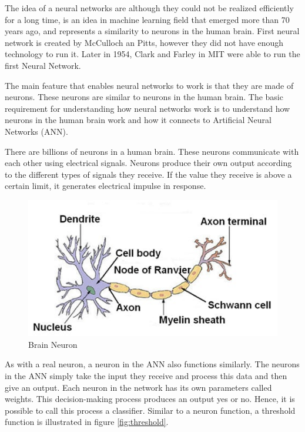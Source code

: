 The idea of a neural networks are although they could not be realized efficiently for a long time, is an idea in machine learning field that emerged more than 70 years ago, and represents a similarity to neurons in the human brain. First neural network is created by McCulloch an Pitts, however they did not have enough technology to run it. Later in 1954, Clark and Farley in MIT were able to run the first Neural Network.

The main feature that enables neural networks to work is that they are made of neurons. These neurons are similar to neurons in the human brain. The basic requirement for understanding how neural networks work is to understand how neurons in the human brain work and how it connects to Artificial Neural Networks (ANN).

There are billions of neurons in a human brain. These neurons communicate with each other using electrical signals. Neurons produce their own output according to the different types of signals they receive. If the value they receive is above a certain limit, it generates electrical impulse in response.

\begin{figure}[h]
    \centering
    \includegraphics{figures/chapter3/braincell.png}
    \caption{Brain Neuron}
    \label{fig:brain_neuron}
\end{figure}

As with a real neuron, a neuron in the ANN also functions similarly. The neurons in the ANN simply take the input they receive and process this data and then give an output. Each neuron in the network has its own parameters called weights. This decision-making process produces an output yes or no. Hence, it is possible to call this process a classifier. Similar to a neuron function, a threshold function is illustrated in figure \ref{fig:threshold}.

